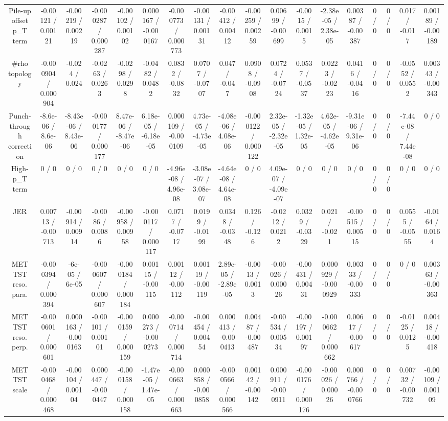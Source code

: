 \documentclass[10pt]{article}
\begin{document}
\begin{table}[htbp]
\begin{center}
\begin{tabular}{|c|c|c|c|c|c|c|c|c|c|c|c|c|c|c|c|c|c|}
  Pile-up offset p_{T} term & -0.00121 / 0.00121 & -0.00219 / 0.00219 & -0.000287 / 0.000287 & -0.00102 / 0.00102 & 0.000167 / -0.000167 & -0.000773 / 0.000773 & -0.00131 / 0.00131 & -0.00412 / 0.00412 & -0.00259 / 0.00259 & 0.00699 / -0.00699 & -0.0015 / 0.0015 & -2.38e-05 / 2.38e-05 & 0.00387 / -0.00387 & 0 / 0 & 0 / 0 & 0.017 / -0.017 & 0.00189 / -0.00189 \\ 
  #rho topology & -0.000904 / 0.000904 & -0.024 / 0.024 & -0.0263 / 0.0263 & -0.0298 / 0.0298 & -0.0482 / 0.0482 & 0.0832 / -0.0832 & 0.0707 / -0.0707 & 0.047 / -0.047 & 0.0908 / -0.0908 & 0.0724 / -0.0724 & 0.0537 / -0.0537 & 0.0223 / -0.0223 & 0.0416 / -0.0416 & 0 / 0 & 0 / 0 & -0.0552 / 0.0552 & 0.00343 / -0.00343 \\ 
  Punch-through correction & -8.6e-06 / 8.6e-06 & -8.43e-06 / 8.43e-06 & -0.000177 / 0.000177 & 8.47e-06 / -8.47e-06 & 6.18e-05 / -6.18e-05 & 0.000109 / -0.000109 & 4.73e-05 / -4.73e-05 & -4.08e-06 / 4.08e-06 & -0.000122 / 0.000122 & 2.32e-05 / -2.32e-05 & -1.32e-05 / 1.32e-05 & 4.62e-05 / -4.62e-05 & -9.31e-06 / 9.31e-06 & 0 / 0 & 0 / 0 & -7.44e-08 / 7.44e-08 & 0 / 0 \\ 
  High-p_{T} term & 0 / 0 & 0 / 0 & 0 / 0 & 0 / 0 & 0 / 0 & -4.96e-08 / 4.96e-08 & -3.08e-07 / 3.08e-07 & -4.64e-08 / 4.64e-08 & 0 / 0 & 4.09e-07 / -4.09e-07 & 0 / 0 & 0 / 0 & 0 / 0 & 0 / 0 & 0 / 0 & 0 / 0 & 0 / 0 \\ 
  JER & 0.00713 / -0.00713 & -0.00914 / 0.00914 & -0.0086 / 0.0086 & -0.00958 / 0.00958 & -0.000117 / 0.000117 & 0.0717 / -0.0717 & 0.0199 / -0.0199 & 0.0348 / -0.0348 & 0.126 / -0.126 & -0.0212 / 0.0212 & 0.0329 / -0.0329 & 0.021 / -0.021 & -0.00515 / 0.00515 & 0 / 0 & 0 / 0 & 0.0555 / -0.0555 & -0.0164 / 0.0164 \\ 
  MET TST reso. para. & -0.000394 / 0.000394 & -6e-05 / 6e-05 & -0.000607 / 0.000607 & -0.000184 / 0.000184 & 0.00115 / -0.00115 & 0.00112 / -0.00112 & 0.00119 / -0.00119 & 2.89e-05 / -2.89e-05 & -0.0013 / 0.0013 & -0.00026 / 0.00026 & -0.00431 / 0.00431 & 0.000929 / -0.000929 & 0.00333 / -0.00333 & 0 / 0 & 0 / 0 & 0 / 0 & 0.00363 / -0.00363 \\ 
  MET TST reso. perp. & -0.000601 / 0.000601 & 0.000163 / -0.000163 & -0.00101 / 0.00101 & -0.000159 / 0.000159 & 0.000273 / -0.000273 & -0.000714 / 0.000714 & -0.00454 / 0.00454 & 0.000413 / -0.000413 & 0.00487 / -0.00487 & -0.00534 / 0.00534 & -0.00197 / 0.00197 & -0.000662 / 0.000662 & 0.00617 / -0.00617 & 0 / 0 & 0 / 0 & -0.0125 / 0.0125 & 0.00418 / -0.00418 \\ 
  MET TST scale & -0.000468 / 0.000468 & -0.00104 / 0.00104 & 0.000447 / -0.000447 & -0.000158 / 0.000158 & -1.47e-05 / 1.47e-05 & -0.000663 / 0.000663 & 0.000858 / -0.000858 & -0.000566 / 0.000566 & 0.00142 / -0.00142 & 0.000911 / -0.000911 & -0.000176 / 0.000176 & -0.00026 / 0.00026 & 0.000766 / -0.000766 & 0 / 0 & 0 / 0 & 0.00732 / -0.00732 & -0.00109 / 0.00109 \\ 

\end{tabular}
\end{center}
\end{table}
\end{document}
